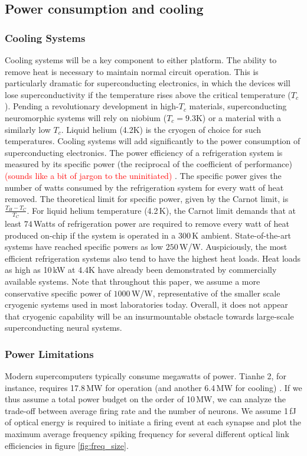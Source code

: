 \documentclass[twocolumn]{article}
\begin{document}
\subsection{Power consumption and cooling}
\subsubsection{Cooling Systems}
Cooling systems will be a key component to either platform. The ability to remove heat is necessary to maintain normal circuit operation. This is particularly dramatic for superconducting electronics, in which the devices will lose superconductivity if the temperature rises above the critical temperature ($T_c$). Pending a revolutionary development in high-$T_c$ materials, superconducting neuromorphic systems will rely on niobium ($T_c = 9.3$K) or a material with a similarly low $T_c$. Liquid helium (4.2K) is the cryogen of choice for such temperatures. Cooling systems will add significantly to the power consumption of superconducting electronics. The power efficiency of a refrigeration system is measured by its specific power (the reciprocal of the coefficient of performance) \textcolor{red}{(sounds like a bit of jargon to the uninitiated)} \cite{}. The specific power gives the number of watts consumed by the refrigeration system for every watt of heat removed. The theoretical limit for specific power, given by the Carnot limit, is $\frac{T_H - T_C}{T_C}$. For liquid helium temperature (4.2\,K), the Carnot limit demands that at least $74$\,Watts of refrigeration power are required to remove every watt of heat produced on-chip if the system is operated in a 300\,K ambient. State-of-the-art systems have reached specific powers as low $250$\,W/W. Auspiciously, the most efficient refrigeration systems also tend to have the highest heat loads. Heat loads as high as 10\,kW at 4.4K have already been demonstrated by commercially available systems. Note that throughout this paper, we assume a more conservative specific power of $1000$\,W/W, representative of the smaller scale cryogenic systems used in most laboratories today. Overall, it does not appear that cryogenic capability will be an insurmountable obstacle towards large-scale superconducting neural systems.
\subsubsection{Power Limitations}
Modern supercomputers typically consume megawatts of power. Tianhe 2, for instance, requires 17.8\,MW for operation (and another 6.4\,MW for cooling) \cite{tolpygo2016superconductor}. If we thus assume a total power budget on the order of 10\,MW, we can analyze the trade-off between average firing rate and the number of neurons. We assume 1\,fJ of optical energy is required to initiate a firing event at each synapse and plot the maximum average frequency spiking frequency for several different optical link efficiencies in figure \ref{fig:freq_size}.
\end{document}
